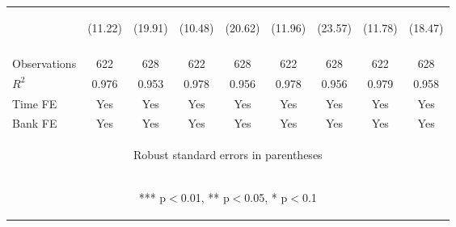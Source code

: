 \documentclass[]{article}
\begin{document}
\begin{center}
\begin{tabular}{lcccccccc}
 & \begin{footnotesize}(11.22)\end{footnotesize} & \begin{footnotesize}(19.91)\end{footnotesize} & \begin{footnotesize}(10.48)\end{footnotesize} & \begin{footnotesize}(20.62)\end{footnotesize} & \begin{footnotesize}(11.96)\end{footnotesize} & \begin{footnotesize}(23.57)\end{footnotesize} & \begin{footnotesize}(11.78)\end{footnotesize} & \begin{footnotesize}(18.47)\end{footnotesize} \\
\vspace{4pt} & \begin{footnotesize}\end{footnotesize} & \begin{footnotesize}\end{footnotesize} & \begin{footnotesize}\end{footnotesize} & \begin{footnotesize}\end{footnotesize} & \begin{footnotesize}\end{footnotesize} & \begin{footnotesize}\end{footnotesize} & \begin{footnotesize}\end{footnotesize} & \begin{footnotesize}\end{footnotesize} \\
Observations & 622 & 628 & 622 & 628 & 622 & 628 & 622 & 628 \\
$R^2$ & 0.976 & 0.953 & 0.978 & 0.956 & 0.978 & 0.956 & 0.979 & 0.958 \\
Time FE & Yes & Yes & Yes & Yes & Yes & Yes & Yes & Yes \\
 Bank FE & Yes & Yes & Yes & Yes & Yes & Yes & Yes & Yes \\ \hline
\multicolumn{9}{c}{\begin{footnotesize} Robust standard errors in parentheses\end{footnotesize}} \\
\multicolumn{9}{c}{\begin{footnotesize} *** p$<$0.01, ** p$<$0.05, * p$<$0.1\end{footnotesize}} \\
\end{tabular}
\end{center}
\end{document}
